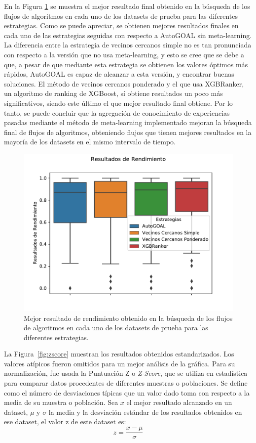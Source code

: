En la Figura \ref{fig:bestfn} se muestra el mejor resultado final obtenido en la búsqueda de los flujos de algoritmos en cada uno de los datasets de prueba para las diferentes estrategias. Como se puede apreciar, se obtienen mejores resultados finales en cada uno de las estrategias seguidas con respecto a AutoGOAL sin meta-learning. La diferencia entre la estrategia de vecinos cercanos simple no es tan pronunciada con respecto a  la versión que no usa meta-learning, y esto se cree que se debe a que, a pesar de que mediante esta estrategia se obtienen los valores óptimos más rápidos, AutoGOAL es capaz de alcanzar a esta versión, y encontrar buenas soluciones. El método de vecinos cercanos ponderado y el que usa XGBRanker, un algoritmo de ranking de XGBoost, sí obtiene resultados un poco más significativos, siendo este último el que mejor resultado final obtiene. Por lo tanto, se puede concluir que la agregación de conocimiento de experiencias pasadas mediante el método de meta-learning implementado mejoran la búsqueda final de flujos de algoritmos, obteniendo flujos que tienen mejores resultados en la mayoría de los datasets en el mismo intervalo de tiempo.

\begin{figure}[H]
\centering
\includegraphics[scale=.8]{Figures/best-fn.pdf}
\caption{Mejor resultado de rendimiento obtenido en la búsqueda de los flujos de algoritmos en cada uno de los datasets de prueba para las diferentes estrategias.}
\label{fig:bestfn}
\end{figure}

La Figura~\ref{fig:zscore} muestran los resultados obtenidos estandarizados. Los valores atípicos fueron omitidos para un mejor análisis de la gráfica. Para su normalización, fue usada la Puntuación Z o \textit{Z-Score}, que se utiliza en estadística para comparar datos procedentes de diferentes muestras o poblaciones. Se define como el número de desviaciones típicas que un valor dado toma con respecto a la media de su muestra o población. Sea $x$ el mejor resultado alcanzado en un dataset, $\mu$ y $\sigma$ la media y la desviación estándar de los resultados obtenidos en ese dataset, el valor z de este dataset es: $$z = \dfrac{x - \mu}{\sigma}$$

